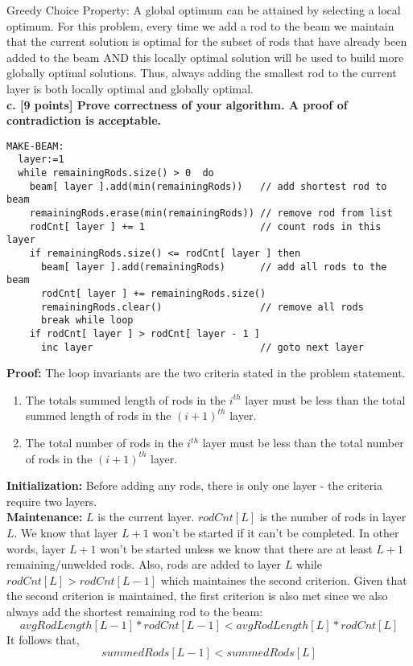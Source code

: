 \documentclass[12pt]{article}
\begin{document}
Greedy Choice Property: A global optimum can be attained by selecting a local optimum. For this problem, every time we add a rod to the beam we maintain that the current solution is optimal for the subset of rods that have already been added to the beam AND this locally optimal solution will be used to build more globally optimal solutions. Thus, always adding the smallest rod to the current layer is both locally optimal and globally optimal. \\

\noindent \textbf{c. [9 points] Prove correctness of your algorithm. A proof of contradiction is acceptable.}

\begin{lstlisting}[frame=single]
MAKE-BEAM:
  layer:=1                                                        
  while remainingRods.size() > 0  do 
    beam[ layer ].add(min(remainingRods))   // add shortest rod to beam
    remainingRods.erase(min(remainingRods)) // remove rod from list
    rodCnt[ layer ] += 1                    // count rods in this layer
    if remainingRods.size() <= rodCnt[ layer ] then
      beam[ layer ].add(remainingRods)      // add all rods to the beam
      rodCnt[ layer ] += remainingRods.size()
      remainingRods.clear()                 // remove all rods 
      break while loop
    if rodCnt[ layer ] > rodCnt[ layer - 1 ]
      inc layer                             // goto next layer
\end{lstlisting} 

\noindent \textbf{Proof: } 
The loop invariants are the two criteria stated in the problem statement.
\begin{enumerate}
  \item The totals summed length of rods in the $i^{th}$ layer must be less
    than the total summed length of rods in the $(i+1)^{th}$ layer.
  \item The total number of rods in the $i^{th}$ layer must be less than the
    total number of rods in the $(i+1)^{th}$ layer.
\end{enumerate}

\noindent \textbf{Initialization: } Before adding any rods, there is only one layer - the criteria require two layers. \\
\noindent \textbf{Maintenance: } $L$ is the current layer. $rodCnt[ L ]$ is the number of rods in layer $L$. 
We know that layer $L+1$ won't be started if it can't be completed. In other words, layer $L+1$ won't 
be started unless we know that there are at least $L+1$ remaining/unwelded rods. 
Also, rods are added to layer $L$ while $rodCnt[ L ] > rodCnt[ L-1 ]$ which maintaines the 
second criterion.
Given that the second criterion is maintained, the first criterion is also met since we also always 
add the shortest remaining rod to the beam:
\[ 
avgRodLength[ L-1 ] * rodCnt[ L-1 ] < avgRodLength[ L ] * rodCnt[ L ] 
\]
It follows that, 
\[
    summedRods[ L-1 ] < summedRods[ L ]
\]
\end{document}
